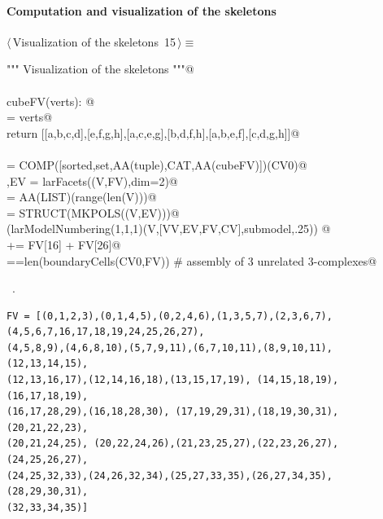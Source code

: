 \documentclass[11pt,oneside]{article}    %
\begin{document}
\paragraph{Computation and visualization of the skeletons}
\begin{flushleft} \small \label{scrap24}
\protect{}$\langle\,$Visualization of the skeletons\nobreak\ {\footnotesize 15}$\,\rangle\equiv$
\vspace{-1ex}
\begin{list}{}{} \item
\mbox{}\verb@""" Visualization of the skeletons """@\\
\mbox{}\verb@@\\
\mbox{}\verb@def cubeFV(verts): @\\
\mbox{}\verb@    [a,b,c,d,  e,f,g,h] = verts@\\
\mbox{}\verb@    return [[a,b,c,d],[e,f,g,h],[a,c,e,g],[b,d,f,h],[a,b,e,f],[c,d,g,h]]@\\
\mbox{}\verb@@\\
\mbox{}\verb@FV = COMP([sorted,set,AA(tuple),CAT,AA(cubeFV)])(CV0)@\\
\mbox{}\verb@V,EV = larFacets((V,FV),dim=2)@\\
\mbox{}\verb@VV = AA(LIST)(range(len(V)))@\\
\mbox{}\verb@submodel = STRUCT(MKPOLS((V,EV)))@\\
\mbox{}\verb@VIEW(larModelNumbering(1,1,1)(V,[VV,EV,FV,CV],submodel,.25)) @\\
\mbox{}\verb@FV[5] += FV[16] + FV[26]@\\
\mbox{}==len(boundaryCells(CV0,FV))  # assembly of 3 unrelated 3-complexes@\\
\mbox{}\verb@@{\NWsep}
\end{list}
\vspace{-1ex}
\footnotesize\addtolength{\baselineskip}{-1ex}
\begin{list}{}{\setlength{\itemsep}{-\parsep}\setlength{\itemindent}{-\leftmargin}}
\item \NWtxtMacroRefIn\ .
\end{list}
\end{flushleft}

\begin{verbatim}
FV = [(0,1,2,3),(0,1,4,5),(0,2,4,6),(1,3,5,7),(2,3,6,7), 
(4,5,6,7,16,17,18,19,24,25,26,27), 
(4,5,8,9),(4,6,8,10),(5,7,9,11),(6,7,10,11),(8,9,10,11), (12,13,14,15),
(12,13,16,17),(12,14,16,18),(13,15,17,19), (14,15,18,19),(16,17,18,19),
(16,17,28,29),(16,18,28,30), (17,19,29,31),(18,19,30,31),(20,21,22,23),
(20,21,24,25), (20,22,24,26),(21,23,25,27),(22,23,26,27),(24,25,26,27), 
(24,25,32,33),(24,26,32,34),(25,27,33,35),(26,27,34,35), (28,29,30,31),
(32,33,34,35)]
\end{verbatim}
\end{document}
